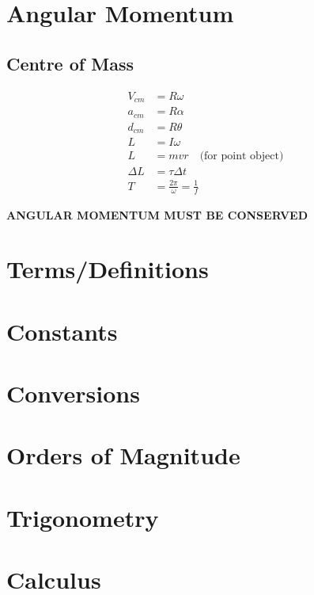 \documentclass[letterpaper,10pt]{article}
\begin{document}
\begin{multicols}{2}
\section{Angular Momentum}
\subsection{Centre of Mass}
\begin{align*}
    V_{cm} &= R \omega \\
    a_{cm} &= R \alpha \\
    d_{cm} &= R \theta \\
    L &= I \omega \\
    L &= mvr \quad \textrm{(for point object)} \\
    \Delta L &= \tau \Delta t \\
    T &= \frac{2 \pi}{\omega} = \frac{1}{f}
\end{align*}

\medskip
\begin{center}
    \textbf{ANGULAR MOMENTUM MUST BE CONSERVED}
\end{center}

\appendix
\section*{Terms/Definitions}

\section*{Constants}

\section*{Conversions}

\section*{Orders of Magnitude}

\section*{Trigonometry}

\section*{Calculus}

\end{multicols}
\end{document}
